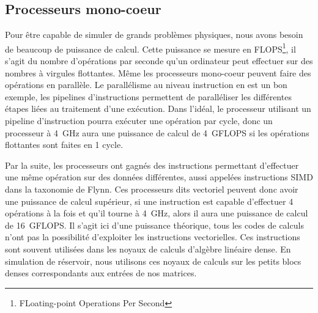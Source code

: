\subsection{Processeurs mono-coeur}
Pour être capable de simuler de grands problèmes physiques, nous avons besoin de beaucoup de puissance de calcul.
%
Cette puissance se mesure en FLOPS\footnote{FLoating-point Operations Per Second}, il s'agit du nombre d'opérations par seconde qu'un ordinateur peut effectuer sur des nombres à virgules flottantes.
%
Même les processeurs mono-coeur peuvent faire des opérations en parallèle.
%
Le parallélisme au niveau instruction en est un bon exemple, les pipelines d'instructions permettent de paralléliser les différentes étapes liées au traitement d'une exécution.
%
Dans l'idéal, le processeur utilisant un pipeline d'instruction pourra exécuter une opération par cycle, donc un processeur à 4~GHz aura une puissance de calcul de 4~GFLOPS si les opérations flottantes sont faites en 1 cycle.


Par la suite, les processeurs ont gagnés des instructions permettant d'effectuer une même opération sur des données différentes, aussi appelées instructions SIMD dans la taxonomie de Flynn.
%
Ces processeurs dits vectoriel peuvent donc avoir une puissance de calcul supérieur, si une instruction est capable d'effectuer 4 opérations à la fois et qu'il tourne à 4~GHz, alors il aura une puissance de calcul de 16~GFLOPS.
%
Il s'agit ici d'une puissance théorique, tous les codes de calculs n'ont pas la possibilité d'exploiter les instructions vectorielles.
%
Ces instructions sont souvent utilisées dans les noyaux de calculs d'algèbre linéaire dense.
%
En simulation de réservoir, nous utilisons ces noyaux de calculs sur les petits blocs denses correspondants aux entrées de nos matrices.
